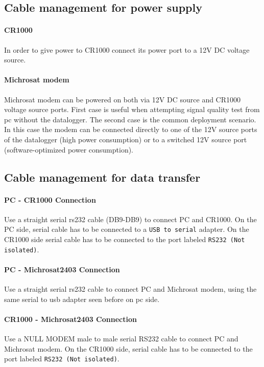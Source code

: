 \subsection{Cable management for power supply}
\paragraph{CR1000}
In order to give power to CR1000 connect its power port to a 12V DC voltage source.
\paragraph{Michrosat modem}
Michrosat modem can be powered on both via 12V DC source and CR1000 voltage source ports. First case is useful when attempting signal quality test from pc without the datalogger.
The second case is the common deployment scenario. In this case the modem can be connected directly to one of the 12V source ports of the datalogger (high power consumption) or to a switched 12V source port (software-optimized power consumption).
\subsection{Cable management for data transfer}
\label{subsec:datacable}
\paragraph{PC - CR1000 Connection}
Use a straight serial rs232 cable (DB9-DB9) to connect PC and CR1000. On the PC side, serial cable has to be connected to a {\tt USB to serial} adapter. On the CR1000 side serial cable has to be connected to the port labeled {\tt RS232 (Not isolated)}.
\paragraph{PC - Michrosat2403 Connection}
Use a straight serial rs232 cable to connect PC and Michrosat modem, using the same serial to usb adapter seen before on pc side.
\paragraph{CR1000 - Michrosat2403 Connection}
Use a NULL MODEM male to male serial RS232 cable to connect PC and Michrosat modem. On the CR1000 side, serial cable has to be connected to the port labeled {\tt RS232 (Not isolated)}.